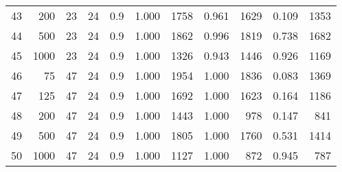 \documentclass{article}
\begin{document}
\begin{tabular}{rrrrrrrrrrr}
  43 & 200 & 23 & 24 & 0.9 & 1.000 & 1758 & 0.961 & 1629 & 0.109 & 1353 \\ 
  44 & 500 & 23 & 24 & 0.9 & 1.000 & 1862 & 0.996 & 1819 & 0.738 & 1682 \\ 
  45 & 1000 & 23 & 24 & 0.9 & 1.000 & 1326 & 0.943 & 1446 & 0.926 & 1169 \\ 
   \hline
46 & 75 & 47 & 24 & 0.9 & 1.000 & 1954 & 1.000 & 1836 & 0.083 & 1369 \\ 
  47 & 125 & 47 & 24 & 0.9 & 1.000 & 1692 & 1.000 & 1623 & 0.164 & 1186 \\ 
  48 & 200 & 47 & 24 & 0.9 & 1.000 & 1443 & 1.000 & 978 & 0.147 & 841 \\ 
  49 & 500 & 47 & 24 & 0.9 & 1.000 & 1805 & 1.000 & 1760 & 0.531 & 1414 \\ 
  50 & 1000 & 47 & 24 & 0.9 & 1.000 & 1127 & 1.000 & 872 & 0.945 & 787 \\ 
   \hline
\end{tabular}\newpage
\end{document}

